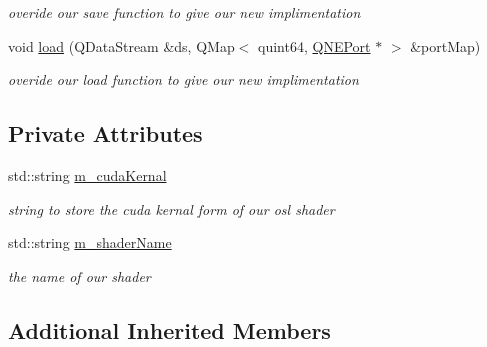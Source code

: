 \begin{DoxyCompactItemize}
\begin{DoxyCompactList}\small\item\em overide our save function to give our new implimentation \end{DoxyCompactList}\item 
\hypertarget{class_o_s_l_shader_block_a9cf63f4ceb335aea5b6c2d7ba77d9d2c}{void \hyperlink{class_o_s_l_shader_block_a9cf63f4ceb335aea5b6c2d7ba77d9d2c}{load} (Q\-Data\-Stream \&ds, Q\-Map$<$ quint64, \hyperlink{class_q_n_e_port}{Q\-N\-E\-Port} $\ast$ $>$ \&port\-Map)}\label{class_o_s_l_shader_block_a9cf63f4ceb335aea5b6c2d7ba77d9d2c}

\begin{DoxyCompactList}\small\item\em overide our load function to give our new implimentation \end{DoxyCompactList}\end{DoxyCompactItemize}
\subsection*{Private Attributes}
\begin{DoxyCompactItemize}
\item 
\hypertarget{class_o_s_l_shader_block_a7e0482a0ab278134ac53f681c0a54013}{std\-::string \hyperlink{class_o_s_l_shader_block_a7e0482a0ab278134ac53f681c0a54013}{m\-\_\-cuda\-Kernal}}\label{class_o_s_l_shader_block_a7e0482a0ab278134ac53f681c0a54013}

\begin{DoxyCompactList}\small\item\em string to store the cuda kernal form of our osl shader \end{DoxyCompactList}\item 
\hypertarget{class_o_s_l_shader_block_a36de76ba8232506ea576a5167e8fee46}{std\-::string \hyperlink{class_o_s_l_shader_block_a36de76ba8232506ea576a5167e8fee46}{m\-\_\-shader\-Name}}\label{class_o_s_l_shader_block_a36de76ba8232506ea576a5167e8fee46}

\begin{DoxyCompactList}\small\item\em the name of our shader \end{DoxyCompactList}\end{DoxyCompactItemize}
\subsection*{Additional Inherited Members}


